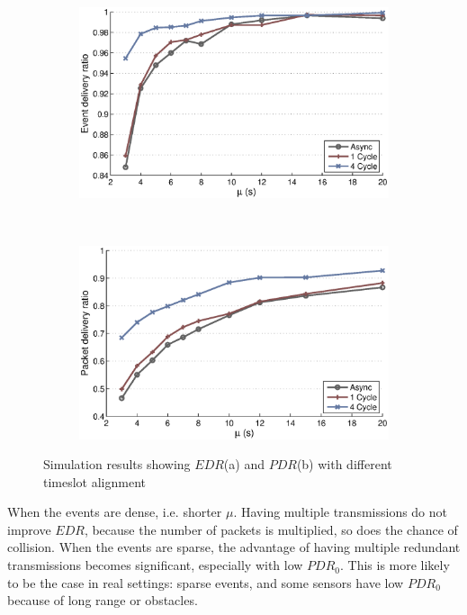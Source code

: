 \begin{figure}[p]
    \centering
    \begin{subfigure}[t]{0.8\textwidth}
        \centering
        \includegraphics[width=\textwidth] {../../sw/pc/matlab/simulation-result/slotting-edr-250evt.eps}
        \caption{}
    \end{subfigure} 
    \\
    \begin{subfigure}[t]{0.8\textwidth}
        \centering
        \includegraphics[width=\textwidth] {../../sw/pc/matlab/simulation-result/slotting-pdr-250evt.eps}
        \caption{}
    \end{subfigure}
    \caption[$EDR$ and $PDR$ with different timeslot alignment]{Simulation results showing $EDR$(a) and $PDR$(b) with different timeslot alignment}\label{fig:edr-pdr-slotting}
\end{figure}

When the events are dense, i.e. shorter $\mu$. Having multiple transmissions do not improve $EDR$, because the number of packets is multiplied, so does the chance of collision. When the events are sparse, the advantage of having multiple redundant transmissions becomes significant, especially with low $PDR_0$. This is more likely to be the case in real settings: sparse events, and some sensors have low $PDR_0$ because of long range or obstacles. 

